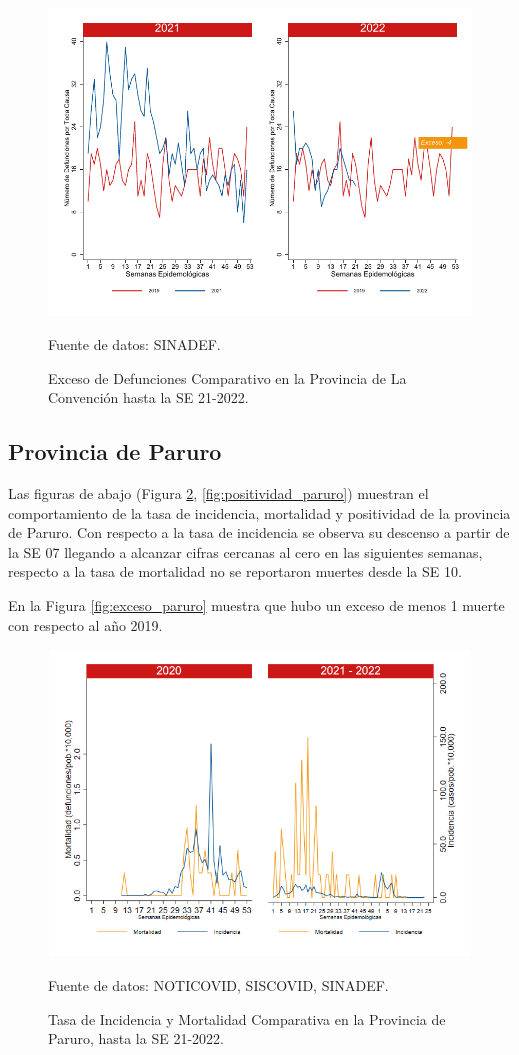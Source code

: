 \documentclass[12pt,a4paper,openany]{book}
\begin{document}
	\begin{figure}[h]
		\caption{Exceso de Defunciones Comparativo en la Provincia de La Convención hasta la SE 21-2022.}\label{fig:exceso_laconv}
		\begin{center}
			\includegraphics[width=0.7\linewidth]{../figuras/exceso_9.pdf}
		\end{center}
		{\footnotesize {Fuente de datos: SINADEF.}}
	\end{figure}
	
	\clearpage
	
	\subsection*{Provincia de Paruro}
	\noindent Las figuras de abajo (Figura \ref{fig:inc_mort_paruro}, \ref{fig:positividad_paruro}) muestran el comportamiento de la tasa de incidencia, mortalidad y positividad de la provincia de Paruro. Con respecto a la tasa de incidencia se observa su descenso a partir de la SE 07 llegando a alcanzar cifras cercanas al cero en las siguientes semanas, respecto a la tasa de mortalidad no se reportaron muertes desde la SE 10.
	
	En la Figura \ref{fig:exceso_paruro} muestra que hubo un exceso de menos 1 muerte con respecto al año 2019.
	
	\begin{figure}[h]
		\caption{Tasa de Incidencia y Mortalidad Comparativa en la Provincia de Paruro, hasta la SE 21-2022.}\label{fig:inc_mort_paruro}
		\begin{center}
			\includegraphics[width=0.85\linewidth]{../figuras/incidencia_mortalidad_20_21_10.png}
		\end{center}
		{\footnotesize {Fuente de datos: NOTICOVID, SISCOVID, SINADEF.}} 
	\end{figure}
	
\end{document}
